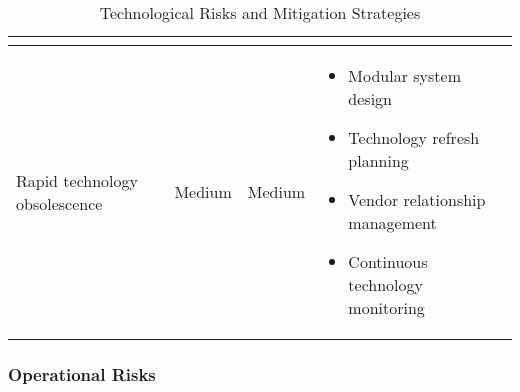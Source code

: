 \begin{table}[H]
\begin{tabular}{|p{3cm}|p{2cm}|p{2cm}|p{7cm}|}
\begin{itemize}
\end{itemize} \\
\hline
Rapid technology obsolescence & Medium & Medium & 
\begin{itemize}
    \item Modular system design
    \item Technology refresh planning
    \item Vendor relationship management
    \item Continuous technology monitoring
\end{itemize} \\
\hline
\end{tabular}
\caption{Technological Risks and Mitigation Strategies}
\end{table}

\subsubsection{Operational Risks}
